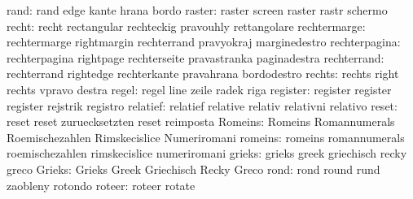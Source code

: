                      rand: rand                      edge
                           kante                     hrana
                           bordo
                   raster: raster                    screen
                           raster                    rastr
                           schermo
                    recht: recht                     rectangular
                           rechteckig                pravouhly
                           rettangolare
             rechtermarge: rechtermarge              rightmargin
                           rechterrand               pravyokraj
                           marginedestro
            rechterpagina: rechterpagina             rightpage
                           rechterseite              pravastranka
                           paginadestra
              rechterrand: rechterrand               rightedge
                           rechterkante              pravahrana
                           bordodestro
                   rechts: rechts                    right
                           rechts                    vpravo
                           destra
                    regel: regel                     line
                           zeile                     radek
                           riga
                 register: register                  register
                           register                  rejstrik
                           registro
                 relatief: relatief                  relative
                           relativ                   relativni
                           relativo
                    reset: reset                     reset
                           zuruecksetzten            reset
                           reimposta
                  Romeins: Romeins                   Romannumerals
                           Roemischezahlen           Rimskecislice
                           Numeriromani
                  romeins: romeins                   romannumerals
                           roemischezahlen           rimskecislice
                           numeriromani
                   grieks: grieks                    greek
                           griechisch                recky
                           greco
                   Grieks: Grieks                    Greek
                           Griechisch                Recky
                           Greco
                     rond: rond                      round
                           rund                      zaobleny
                           rotondo
                   roteer: roteer                    rotate
